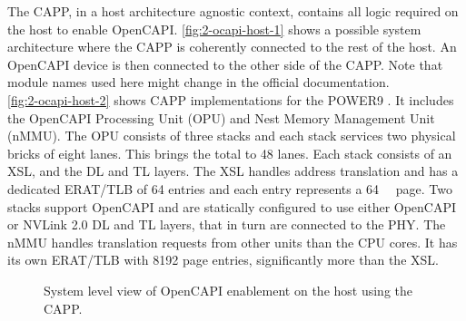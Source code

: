 The CAPP, in a host architecture agnostic context, contains all logic required on the host to enable OpenCAPI. \autoref{fig:2-ocapi-host-1} shows a possible system architecture where the CAPP is coherently connected to the rest of the host. An OpenCAPI device is then connected to the other side of the CAPP. Note that module names used here might change in the official documentation.\\
\autoref{fig:2-ocapi-host-2} shows CAPP implementations for the POWER9 \cite{curt}. It includes the OpenCAPI Processing Unit (OPU) and Nest Memory Management Unit (nMMU). The OPU consists of three stacks and each stack services two physical bricks of eight lanes. This brings the total to 48 lanes. Each stack consists of an XSL, and the DL and TL layers. The XSL handles address translation and has a dedicated ERAT/TLB of 64 entries and each entry represents a \SI{64}{\kilo\byte} page. Two stacks support OpenCAPI and are statically configured to use either OpenCAPI or NVLink 2.0 DL and TL layers, that in turn are connected to the PHY. The nMMU handles translation requests from other units than the CPU cores. It has its own ERAT/TLB with 8192 page entries, significantly more than the XSL.


\begin{figure}[htb!]
  {\caption{System level view of OpenCAPI enablement on the host using the CAPP.}\label{fig:2-ocapi-host}}
\end{figure}



